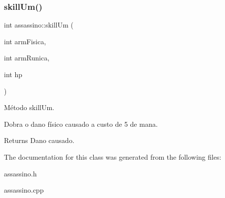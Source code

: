 \subsubsection{\texorpdfstring{skill\+Um()}{skillUm()}}
{\footnotesize\ttfamily int assassino\+::skill\+Um (\begin{DoxyParamCaption}\item[{int}]{arm\+Fisica,  }\item[{int}]{arm\+Runica,  }\item[{int}]{hp }\end{DoxyParamCaption})}



Método skill\+Um. 

Dobra o dano físico causado a custo de 5 de mana. \begin{DoxyReturn}{Returns}
Dano causado. 
\end{DoxyReturn}


The documentation for this class was generated from the following files\+:\begin{DoxyCompactItemize}
\item 
assassino.\+h\item 
assassino.\+cpp\end{DoxyCompactItemize}
